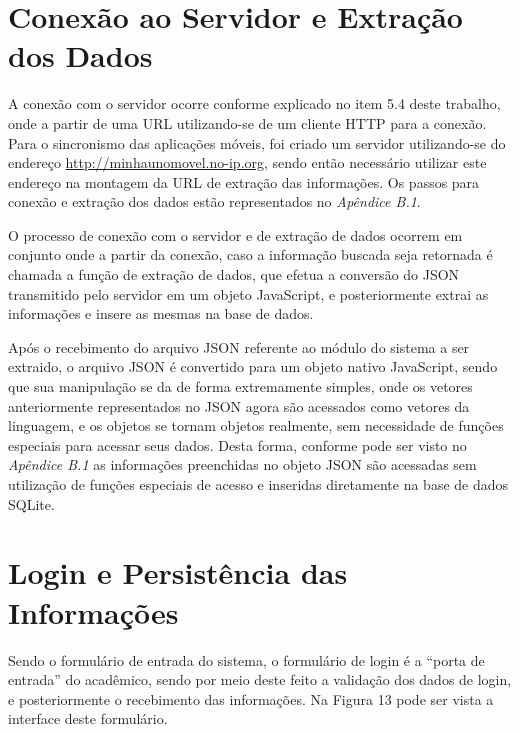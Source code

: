 \section{Conexão ao Servidor e Extração dos Dados}
A conexão com o servidor ocorre conforme explicado no item 5.4 deste trabalho, onde a partir de uma URL utilizando-se de um cliente HTTP para a conexão. Para o sincronismo das aplicações móveis, foi criado um servidor utilizando-se do endereço \url{http://minhaunomovel.no-ip.org}, sendo então necessário utilizar este endereço na montagem da URL de extração das informações. Os passos para conexão e extração dos dados estão representados no \emph{Apêndice B.1}.

O processo de conexão com o servidor e de extração de dados ocorrem em conjunto onde a partir da conexão, caso a informação buscada seja retornada é chamada a função de extração de dados, que efetua a conversão do JSON transmitido pelo servidor em um objeto JavaScript, e posteriormente extrai as informações e insere as mesmas na base de dados. 

Após o recebimento do arquivo JSON referente ao módulo do sistema a ser extraido, o arquivo JSON é convertido para um objeto nativo JavaScript, sendo que sua manipulação se da de forma extremamente simples, onde os vetores anteriormente representados no JSON agora são acessados como vetores da linguagem, e os objetos se tornam objetos realmente, sem necessidade de funções especiais para acessar seus dados. Desta forma, conforme pode ser visto no \emph{Apêndice B.1} as informações preenchidas no objeto JSON são acessadas sem utilização de funções especiais de acesso e inseridas diretamente na base de dados SQLite.

\section{Login e Persistência das Informações}
Sendo o formulário de entrada do sistema, o formulário de login é a ``porta de entrada'' do acadêmico, sendo por meio deste feito a validação dos dados de login, e posteriormente o recebimento das informações. Na Figura 13 pode ser vista a interface deste formulário.


